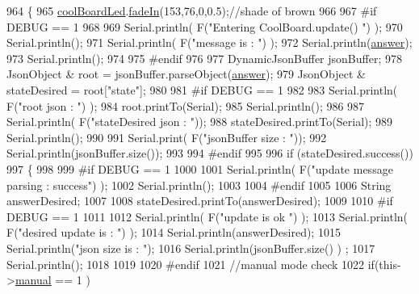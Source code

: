 \begin{DoxyCode}
964 \{
965     \hyperlink{class_cool_board_a1b1d3c684a5baa56b08486e192fd8e97}{coolBoardLed}.\hyperlink{class_cool_board_led_ab778f5e7bed0ab74e3906d82110493c3}{fadeIn}(153,76,0,0.5);\textcolor{comment}{//shade of brown        }
966 
967 \textcolor{preprocessor}{#if DEBUG == 1}
968 
969     Serial.println( F(\textcolor{stringliteral}{"Entering CoolBoard.update() "}) );
970     Serial.println();
971     Serial.println( F(\textcolor{stringliteral}{"message is : "}) );
972     Serial.println(\hyperlink{class_cool_board_a7b835fafd449e5282f7f91d787a2dc15}{answer});
973     Serial.println();
974 
975 \textcolor{preprocessor}{#endif}
976 
977     DynamicJsonBuffer jsonBuffer;
978     JsonObject & root = jsonBuffer.parseObject(\hyperlink{class_cool_board_a7b835fafd449e5282f7f91d787a2dc15}{answer});
979     JsonObject & stateDesired = root[\textcolor{stringliteral}{"state"}];
980 
981 \textcolor{preprocessor}{#if DEBUG == 1}
982 
983     Serial.println( F(\textcolor{stringliteral}{"root json : "}) );
984     root.printTo(Serial);
985     Serial.println();
986 
987     Serial.println( F(\textcolor{stringliteral}{"stateDesired json : "}));
988     stateDesired.printTo(Serial);
989     Serial.println();
990     
991     Serial.print( F(\textcolor{stringliteral}{"jsonBuffer size : "}));
992     Serial.println(jsonBuffer.size());
993 
994 \textcolor{preprocessor}{#endif}
995 
996     \textcolor{keywordflow}{if} (stateDesired.success())
997     \{
998     
999 \textcolor{preprocessor}{    #if DEBUG == 1}
1000 
1001         Serial.println( F(\textcolor{stringliteral}{"update message parsing : success"}) );
1002         Serial.println();
1003     
1004 \textcolor{preprocessor}{    #endif}
1005 
1006             String answerDesired;
1007         
1008             stateDesired.printTo(answerDesired);
1009             
1010 \textcolor{preprocessor}{        #if DEBUG == 1      }
1011         
1012             Serial.println( F(\textcolor{stringliteral}{"update is ok "}) );
1013             Serial.println( F(\textcolor{stringliteral}{"desired update is : "}) );            
1014             Serial.println(answerDesired);
1015             Serial.println(\textcolor{stringliteral}{"json size is : "});
1016             Serial.println(jsonBuffer.size() ) ;                
1017             Serial.println();
1018 
1019         
1020 \textcolor{preprocessor}{        #endif}
1021             \textcolor{comment}{//manual mode check}
1022             \textcolor{keywordflow}{if}(this->\hyperlink{class_cool_board_a7c8e505a5804b109e112d5a03df6ea2b}{manual} == 1 )

\end{DoxyCode}
